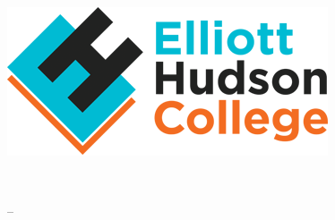 \vspace{-0.5cm}
\includegraphics[scale=0.35]{images/ehc-logo-retina}

\vspace{8.5cm}
\begin{minipage}{\textwidth}
	\sffamily

	\vspace{2mm}
	{\YUGE \raggedleft\bookletunittitle\\}

	\vspace{1mm}
	{\huge \raggedleft\coursetitle { }-- \formattedunittitle\\}

	\vspace{2mm}
	{\small \raggedleft\bookletsubtitle\\}
\end{minipage}